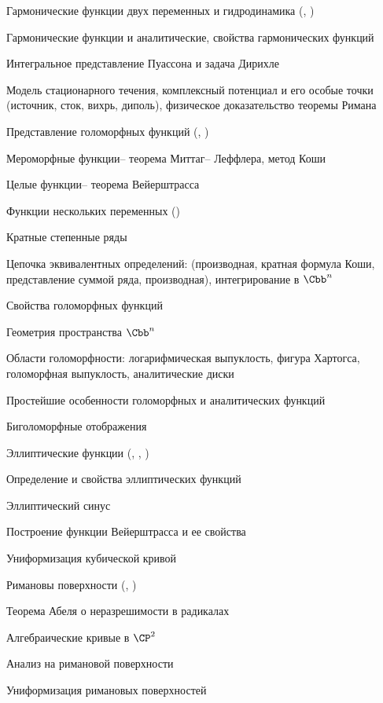 \documentclass[a4paper]{article}
\begin{document}
\begin{nums}{-2}
\item Гармонические функции двух переменных и гидродинамика (\cite{shabat-first}, \cite{lavr-shabat})
  \begin{items}{-2}
    \item Гармонические функции и аналитические, свойства гармонических функций
    \item Интегральное представление Пуассона и задача Дирихле
    \item Модель стационарного течения, комплексный потенциал и его особые точки
          (источник, сток, вихрь, диполь), физическое доказательство теоремы Римана
  \end{items}
\item Представление голоморфных функций (\cite{shabat-first}, \cite{sid-fed-shab})
  \begin{items}{-2}
    \item Мероморфные функции-- теорема Миттаг-- Леффлера, метод Коши
    \item Целые функции-- теорема Вейерштрасса
  \end{items}
\item Функции нескольких переменных (\cite{shabat-second})
  \begin{items}{-2}
    \item Кратные степенные ряды
    \item Цепочка эквивалентных определений: (производная, кратная формула Коши,
           представление суммой ряда, производная), интегрирование в $\Cbb^n$
    \item Свойства голоморфных функций
    \item Геометрия пространства $\Cbb^n$
    \item Области голоморфности: логарифмическая выпуклость, фигура Хартогса,
             голоморфная выпуклость,  аналитические диски
    \item Простейшие особенности голоморфных и аналитических функций
    \item Биголоморфные отображения
  \end{items}
\item Эллиптические функции (\cite{shabat-first}, \cite{lavr-shabat}, \cite{gurvitz-courant})
  \begin{items}{-2}
    \item Определение и свойства эллиптических функций
    \item Эллиптический синус
    \item Построение функции Вейерштрасса и ее свойства
    \item Униформизация кубической кривой
  \end{items}
\item Римановы поверхности (\cite{gurvitz-courant}, \cite{alexeev})
  \begin{items}{-2}
    \item Теорема Абеля о неразрешимости в радикалах
    \item Алгебраические кривые в $\CP^2$
    \item Анализ на римановой поверхности
    \item Униформизация римановых поверхностей
  \end{items}
\end{nums}
\end{document}
